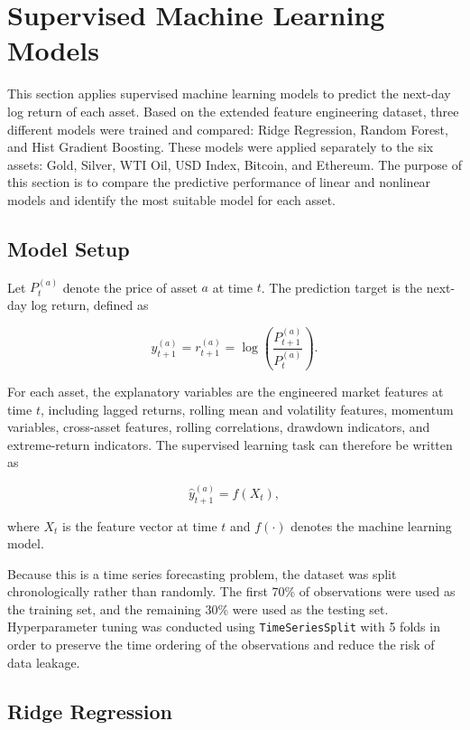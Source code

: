 \documentclass[12pt]{article}
\begin{document}
\section{Supervised Machine Learning Models}

This section applies supervised machine learning models to predict the next-day log return of each asset. Based on the extended feature engineering dataset, three different models were trained and compared: Ridge Regression, Random Forest, and Hist Gradient Boosting. These models were applied separately to the six assets: Gold, Silver, WTI Oil, USD Index, Bitcoin, and Ethereum. The purpose of this section is to compare the predictive performance of linear and nonlinear models and identify the most suitable model for each asset.

\subsection{Model Setup}

Let $P_t^{(a)}$ denote the price of asset $a$ at time $t$. The prediction target is the next-day log return, defined as

\begin{equation}
y_{t+1}^{(a)} = r_{t+1}^{(a)}
=
\log\left(\frac{P_{t+1}^{(a)}}{P_t^{(a)}}\right).
\end{equation}

For each asset, the explanatory variables are the engineered market features at time $t$, including lagged returns, rolling mean and volatility features, momentum variables, cross-asset features, rolling correlations, drawdown indicators, and extreme-return indicators. The supervised learning task can therefore be written as

\begin{equation}
\hat{y}_{t+1}^{(a)} = f(X_t),
\end{equation}

where $X_t$ is the feature vector at time $t$ and $f(\cdot)$ denotes the machine learning model.

Because this is a time series forecasting problem, the dataset was split chronologically rather than randomly. The first 70\% of observations were used as the training set, and the remaining 30\% were used as the testing set. Hyperparameter tuning was conducted using \texttt{TimeSeriesSplit} with 5 folds in order to preserve the time ordering of the observations and reduce the risk of data leakage.

\subsection{Ridge Regression}
\end{document}
